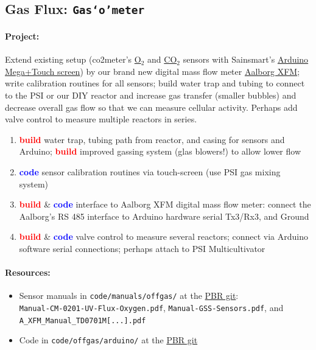\documentclass[12pt,a4paper]{scrartcl}
\newcommand{\git}[0]{\href{https://git.hhu.de/machne/pbr_hackathon_201503}{PBR git}}
\newcommand{\build}[0]{\textcolor{red}{\textbf{build}}}
\newcommand{\code}[0]{\textcolor{blue}{\textbf{code}}}
\newcommand{\gasometer}[0]{\texttt{Gas`o'meter}}
\newcommand{\ox}[0]{O$_2$}
\newcommand{\cox}[0]{CO$_2$}
\begin{document}
\subsection{Gas Flux: \gasometer{}}
\label{gas}
\paragraph{Project:} 
Extend existing setup (co2meter's
\href{http://www.co2meter.com/collections/co2-sensors/oxygen-sensors}{\ox{}}
and
\href{http://www.co2meter.com/collections/co2-sensors/products/cozir-5-100-co2-sensor}{\cox{}}
sensors with Sainsmart's
\href{http://www.sainsmart.com/featured-products/sainsmart-mega2560-board-3-5-tft-lcd-module-display-shield-kit-for-atmel-atmega-avr-16au-atmega8u2.html}{Arduino
  Mega+Touch screen}) by our brand new digital mass flow meter
\href{http://www.aalborg.com/index.php/main_page/product_overview/id_product_overview/63}{Aalborg
  XFM}; write calibration routines for all sensors; build water trap
and tubing to connect to the PSI or our DIY reactor and increase gas
transfer (smaller bubbles) and decrease overall gas flow so that we
can measure cellular activity. Perhaps add valve control to measure
multiple reactors in series.

\begin{enumerate}
\item \build{} water trap, tubing path from reactor, and casing for
  sensors and Arduino; \build{} improved gassing system (glas
  blowers!) to allow lower flow
\item \code{} sensor calibration routines via touch-screen (use PSI
  gas mixing system)
\item \build{} \& \code{} interface to Aalborg XFM digital mass flow
  meter: connect the Aalborg's RS 485 interface to Arduino hardware
  serial Tx3/Rx3, and Ground
\item \build{} \& \code{} valve control to measure several reactors;
  connect via Arduino software serial connections; perhaps attach to
  PSI Multicultivator
\end{enumerate}

\paragraph{Resources:}
\begin{itemize}
\item Sensor manuals in \texttt{code/manuals/offgas/} at the
  \git{}:\\
  \texttt{Manual-CM-0201-UV-Flux-Oxygen.pdf},
  \texttt{Manual-GSS-Sensors.pdf}, and\\
  \texttt{A\_XFM\_Manual\_TD0701M[...].pdf}
\item Code in  \texttt{code/offgas/arduino/} at the
  \git{}
\end{itemize}
\end{document}
